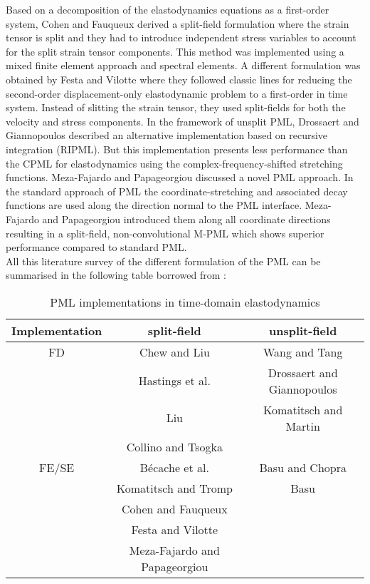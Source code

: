 Based on a decomposition of the elastodynamics equations as a first-order system, Cohen and Fauqueux \cite{Cohen} derived a split-field formulation where the strain tensor is split and they had to introduce independent stress variables to account for the split strain tensor components. This method was implemented using a mixed finite element approach and spectral elements. A different formulation was obtained by Festa and Vilotte \cite{Festa} where they followed classic lines for reducing the second-order displacement-only elastodynamic problem to a first-order in time system. Instead of slitting the strain tensor, they used split-fields for both the velocity and stress components. In the framework of unsplit PML, Drossaert and Giannopoulos \cite{Drossaert1} described an alternative implementation based on recursive integration (RIPML). But this implementation presents less performance than the CPML for elastodynamics using the complex-frequency-shifted stretching functions\cite{Drossaert2}. Meza-Fajardo and Papageorgiou \cite{Meza} discussed a novel PML approach. In the standard approach of PML the coordinate-stretching and associated decay functions are used along the direction normal to the PML interface. Meza-Fajardo and Papageorgiou introduced them along all coordinate directions resulting in a split-field, non-convolutional M-PML which shows superior performance compared to standard PML.  \\
All this literature survey of the different formulation of the PML can be summarised in the following table borrowed from \cite{Kucukcoban}:
\begin{table}[H]
    \centering
    \caption{PML implementations in time-domain elastodynamics}
    \begin{tabular}{c|c|c}
        Implementation & split-field & unsplit-field \\
        \hline
        FD & Chew and Liu \cite{ChewLiu} & Wang and Tang \cite{Wang}\\
         & Hastings et al. \cite{Hastings} & Drossaert and Giannopoulos  \cite{Drossaert1, Drossaert2}\\
         &Liu\cite{Liu} & Komatitsch and Martin \cite{Komatitsch}\\
         &Collino and Tsogka \cite{Collino} & \\
         \hline
        FE/SE &  Bécache et al. \cite{Becache2} & Basu and Chopra \cite{Basu2003}\\
        & Komatitsch and Tromp \cite{Komatitsch}& Basu \cite{Basu2004}\\
        & Cohen and Fauqueux  \cite{Cohen} & \\
        & Festa and Vilotte \cite{Festa} & \\
        & Meza-Fajardo and Papageorgiou \cite{Meza} & 
    \end{tabular}
    
    \label{tab:litterature}
\end{table}
